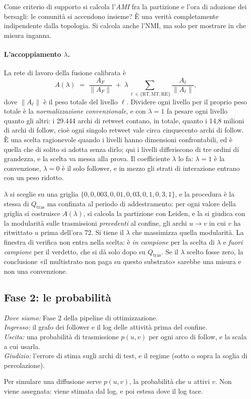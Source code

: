 \documentclass[11pt,a4paper]{article}
\newcommand{\Qtras}{Q_{\mathrm{tras}}}
\newcommand{\dovesiamo}[4]{\par\noindent\begingroup\small\color{black!55}
  \textit{Dove siamo:} #1\\
  \textit{Ingresso:} #2\\
  \textit{Uscita:} #3\\
  \textit{Giudizio:} #4\par\endgroup\medskip}
\begin{document}
Come criterio di supporto si calcola l'\emph{AMI} \citep{vinh2010} fra la partizione e l'ora di adozione dei bersagli: le comunità si accendono insieme? È una verità completamente indipendente dalla topologia. Si calcola anche l'NMI, ma solo per mostrare in che misura inganna.

\paragraph{L'accoppiamento $\lambda$.} La rete di lavoro della fusione calibrata è
\begin{equation}
  A(\lambda) \;=\; \frac{A_F}{\|A_F\|} \;+\; \lambda \sum_{\ell \in \{\mathrm{RT},\mathrm{MT},\mathrm{RE}\}} \frac{A_\ell}{\|A_\ell\|},
\end{equation}
dove $\|A_\ell\|$ è il peso totale del livello $\ell$. Dividere ogni livello per il proprio peso totale è la \emph{normalizzazione convenzionale}, e con $\lambda = 1$ fa pesare ogni livello quanto gli altri: i 29.444 archi di retweet contano, in totale, quanto i 14,8 milioni di archi di follow, cioè ogni singolo retweet vale circa cinquecento archi di follow. È una scelta ragionevole quando i livelli hanno dimensioni confrontabili, ed è quella che di solito si adotta senza dirlo; qui i livelli differiscono di tre ordini di grandezza, e la scelta va messa alla prova. Il coefficiente $\lambda$ lo fa: $\lambda = 1$ è la convenzione, $\lambda = 0$ è il solo follower, e in mezzo gli strati di interazione entrano con un peso ridotto.

$\lambda$ si sceglie su una griglia $\{0, 0{,}003, 0{,}01, 0{,}03, 0{,}1, 0{,}3, 1\}$, e la procedura è la stessa di $\Qtras$ ma confinata al periodo di addestramento: per ogni valore della griglia si costruisce $A(\lambda)$, si calcola la partizione con Leiden, e la si giudica con la modularità sulle trasmissioni \emph{precedenti} al confine, gli archi $u \to v$ in cui $v$ ha ritwittato $u$ prima dell'ora 72. Si tiene il $\lambda$ che massimizza quella modularità. La finestra di verifica non entra nella scelta: è \emph{in campione} per la scelta di $\lambda$ e \emph{fuori campione} per il verdetto, che si dà solo dopo su $\Qtras$. Se il $\lambda$ scelto fosse zero, la conclusione «il multistrato non paga su questo substrato» sarebbe una misura e non una convenzione.

\subsection{Fase 2: le probabilità}
\label{sec:met-fase2}
\dovesiamo{Fase 2 della pipeline di ottimizzazione.}{il grafo dei follower e il log delle attività prima del confine.}{una probabilità di trasmissione $p(u,v)$ per ogni arco di follow, e la scala a cui usarla.}{l'errore di stima sugli archi di test, e il regime (sotto o sopra la soglia di percolazione).}
Per simulare una diffusione serve $p(u,v)$, la probabilità che $u$ attivi $v$. Non viene assegnata: viene stimata dal log, e poi estesa dove il log tace.
\end{document}
